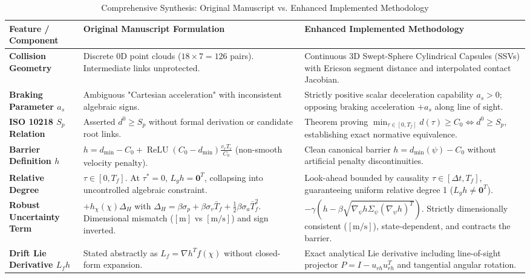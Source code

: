 \documentclass[10pt,twocolumn,a4paper]{article}
\begin{document}
\begin{table}[t!]
\centering
\footnotesize
\setlength{\tabcolsep}{4pt}
\caption{Comprehensive Synthesis: Original Manuscript vs. Enhanced Implemented Methodology}
\label{tab:synthesis}
\begin{tabular}{p{2.8cm} p{7.3cm} p{7.3cm}}
\toprule
\textbf{Feature / Component} & \textbf{Original Manuscript Formulation} & \textbf{Enhanced Implemented Methodology} \\
\midrule
\textbf{Collision Geometry} & Discrete 0D point clouds ($18 \times 7 = 126$ pairs). Intermediate links unprotected. & Continuous 3D Swept-Sphere Cylindrical Capsules (SSVs) with Ericson segment distance and interpolated contact Jacobian. \\
\addlinespace
\textbf{Braking Parameter $a_s$} & Ambiguous "Cartesian acceleration" with inconsistent algebraic signs. & Strictly positive scalar deceleration capability $a_s > 0$; opposing braking acceleration $+a_s$ along line of sight. \\
\addlinespace
\textbf{ISO 10218 $S_p$ Relation} & Asserted $d^0 \ge S_p$ without formal derivation or candidate root links. & Theorem proving $\min_{\tau \in [0, T_f]} d(\tau) \ge C_0 \iff d^0 \ge S_p$, establishing exact normative equivalence. \\
\addlinespace
\textbf{Barrier Definition $h$} & $h = d_{\min} - C_0 + \operatorname{ReLU}(C_0 - d_{\min})\frac{v_r T_r}{C_0}$ (non-smooth velocity penalty). & Clean canonical barrier $h = d_{\min}(\psi) - C_0$ without artificial penalty discontinuities. \\
\addlinespace
\textbf{Relative Degree} & $\tau \in [0, T_f]$. At $\tau^* = 0$, $L_g h = \mathbf{0}^T$, collapsing into uncontrolled algebraic constraint. & Look-ahead bounded by causality $\tau \in [\Delta t, T_f]$, guaranteeing uniform relative degree 1 ($L_g h \ne \mathbf{0}^T$). \\
\addlinespace
\textbf{Robust Uncertainty Term} & $+h_\chi(\chi) \Delta_H$ with $\Delta_H = \beta \sigma_p + \beta \sigma_v \bar{T}_f + \frac{1}{2}\beta \sigma_a \bar{T}_f^2$. Dimensional mismatch ($[\text{m}]$ vs $[\text{m/s}]$) and sign inverted. & $-\gamma (h - \beta \sqrt{\nabla_\psi h \Sigma_\psi (\nabla_\psi h)^T})$. Strictly dimensionally consistent ($[\text{m/s}]$), state-dependent, and contracts the barrier. \\
\addlinespace
\textbf{Drift Lie Derivative $L_f h$} & Stated abstractly as $L_f = \nabla h^T f(\chi)$ without closed-form expansion. & Exact analytical Lie derivative including line-of-sight projector $P = I - u_{rh}u_{rh}^T$ and tangential angular rotation. \\

\end{tabular}
\end{table}
\end{document}
